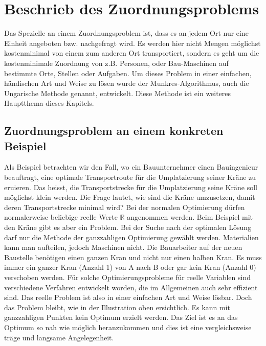 %
%
%
\section{Beschrieb des Zuordnungsproblems
\label{munkres:section:teil1}}

Das Spezielle an einem Zuordnungsproblem ist, dass es an jedem Ort nur eine Einheit angeboten bzw. nachgefragt wird. Es werden hier nicht Mengen möglichst kostenminimal von einem zum anderen
Ort transportiert, sondern es geht um die kostenminimale Zuordnung von z.B. Personen, oder Bau-Maschinen auf bestimmte Orte, Stellen oder Aufgaben.
Um dieses Problem in einer einfachen, händischen Art und Weise zu lösen wurde der Munkres-Algorithmus, auch die Ungarische Methode genannt, entwickelt. Diese Methode ist ein weiteres Hauptthema dieses Kapitels.

\subsection{Zuordnungsproblem an einem konkreten Beispiel
\label{munkres:subsection:bonorum}}
Als Beispiel betrachten wir den Fall, wo ein Bauunternehmer einen Bauingenieur beauftragt, eine optimale Transportroute für die Umplatzierung seiner Kräne zu eruieren. Das heisst, die Transportstrecke für die Umplatzierung seine Kräne
soll möglichst klein werden. 
Die Frage lautet, wie sind die Kräne umzusetzen, damit deren Transportstrecke minimal wird? Bei der normalen Optimierung dürfen normalerweise beliebige reelle Werte $\mathbb{R}$ angenommen werden. 
Beim Beispiel mit den Kräne gibt es aber ein Problem. Bei der Suche nach der optimalen Lösung darf  nur die Methode der ganzzahligen Optimierung gewählt werden. Materialien kann man aufteilen, jedoch Maschinen nicht. Die Bauarbeiter auf der neuen Baustelle benötigen einen ganzen Kran und nicht nur einen halben Kran. Es muss immer ein ganzer Kran (Anzahl 1) von A nach B oder gar kein Kran (Anzahl 0) verschoben werden. 
Für solche Optimierungsprobleme für reelle Variablen sind verschiedene Verfahren entwickelt worden, die im Allgemeinen auch sehr effizient sind. Das reelle Problem ist also in einer einfachen Art und Weise lösbar. Doch das Problem bleibt, wie in der Illustration oben ersichtlich. Es kann mit ganzzahligen Punkten kein Optimum erzielt werden. Das Ziel ist es an das Optimum so nah wie möglich heranzukommen und dies ist eine vergleichsweise träge und langsame Angelegenheit.


